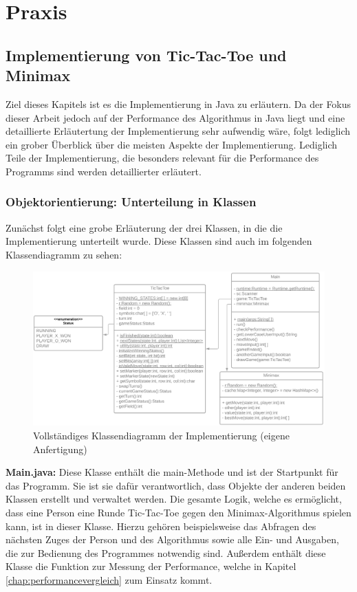 \chapter{Praxis}

\section{Implementierung von Tic-Tac-Toe und Minimax}
Ziel dieses Kapitels ist es die Implementierung in Java zu erläutern. Da der Fokus dieser Arbeit jedoch auf der Performance
des Algorithmus in Java liegt und eine detaillierte Erläutertung der Implementierung sehr aufwendig wäre, folgt lediglich
ein grober Überblick über die meisten Aspekte der Implementierung. Lediglich Teile der Implementierung, die besonders relevant
für die Performance des Programms sind werden detaillierter erläutert. 

\subsection{Objektorientierung: Unterteilung in Klassen}
Zunächst folgt eine grobe Erläuterung der drei Klassen, in die die Implementierung unterteilt wurde.
Diese Klassen sind auch im folgenden Klassendiagramm zu sehen:
\begin{figure}[H]
    \centering
    \includegraphics[scale=0.217]{img/uml_diagram.png}
    \caption[Vollständiges Klassendiagramm der Implementierung]{Vollständiges Klassendiagramm der Implementierung (eigene Anfertigung)}
    \label{fig:uml}
\end{figure}

\textbf{Main.java:} Diese Klasse enthält die main-Methode und ist der Startpunkt für das Programm. Sie ist sie dafür
verantwortlich, dass Objekte der anderen beiden Klassen erstellt und verwaltet werden. Die gesamte Logik, welche es ermöglicht, dass 
eine Person eine Runde Tic-Tac-Toe gegen den Minimax-Algorithmus spielen kann, ist in dieser Klasse. Hierzu gehören beispielsweise 
das Abfragen des nächsten Zuges der Person und des Algorithmus sowie alle Ein- und Ausgaben, die zur Bedienung des Programmes notwendig sind. 
Außerdem enthält diese Klasse die Funktion zur Messung der Performance, welche in Kapitel \ref{chap:performancevergleich} zum Einsatz kommt.

